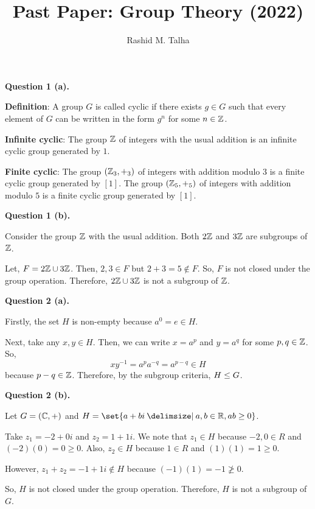 \documentclass[11pt]{penrose}
\title{Past Paper: Group Theory (2022)}
\author{Rashid M. Talha}
\begin{document}
\newenvironment{problem}[2][Question]{\textbf{#1 #2.}\par}{}

\maketitle

\begin{problem}{1 (a)}
    \textbf{Definition}: A group $G$ is called cyclic if there exists $g \in G$ such that every element of $G$ can be written in the form $g^n$ for some $n \in \mathbb{Z}$.

    \textbf{Infinite cyclic}: The group $\mathbb{Z}$ of integers with the usual addition is an infinite cyclic group generated by $1$.
    
    \textbf{Finite cyclic}: The group $(\mathbb{Z}_3, +_3)$ of integers with addition modulo $3$ is a finite cyclic group generated by $[1]$. The group $(\mathbb{Z}_5, +_5)$ of integers with addition modulo $5$ is a finite cyclic group generated by $[1]$.
\end{problem}

\begin{problem}{1 (b)}
    Consider the group $\mathbb{Z}$ with the usual addition. Both $2\mathbb{Z}$ and $3\mathbb{Z}$ are subgroups of $\mathbb{Z}$. 

    Let, $F = 2\mathbb{Z} \cup 3\mathbb{Z}$. Then, $2, 3 \in F$ but $2+3 = 5 \notin F$. So, $F$ is not closed under the group operation. Therefore, $2\mathbb{Z} \cup 3\mathbb{Z}$ is not a subgroup of $\mathbb{Z}$.
\end{problem}

\begin{problem}{2 (a)}
    Firstly, the set $H$ is non-empty because $a^0 = e \in H$.

    Next, take any $x, y \in H$. Then, we can write $x = a^p$ and $y = a^q$ for some $p, q \in \mathbb{Z}$. So,
    \begin{equation*}
        x y^{-1} = a^p a^{-q} = a^{p-q} \in H
    \end{equation*}
    because $p-q \in \mathbb{Z}$. Therefore, by the subgroup criteria, $H \mathrel{\leq} G$.
\end{problem}

\begin{problem}{2 (b)}
    Let $G = (\mathbb{C}, +)$ and $H = \set{a+bi \st a,b \in \R, ab \geq 0}$.

    Take $z_1 = -2 + 0i$ and $z_2 = 1 + 1i$. We note that $z_1 \in H$ because $-2, 0 \in R$ and $(-2)(0) = 0 \geq 0$. Also, $z_2 \in H$ because $1 \in R$ and $(1)(1) = 1 \geq 0$.

    However, $z_1 + z_2 = -1 + 1i \notin H$ because $(-1)(1) = -1 \ngeq 0$.

    So, $H$ is not closed under the group operation. Therefore, $H$ is not a subgroup of $G$.
\end{problem}
\end{document}
